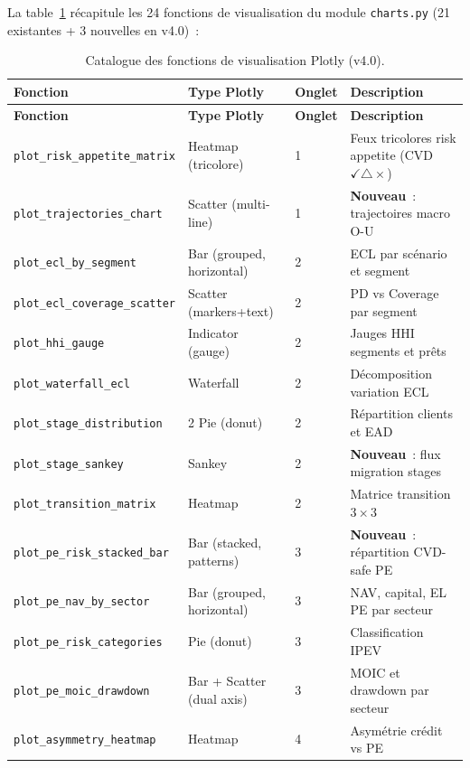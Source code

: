 \documentclass[12pt,a4paper]{article}
\begin{document}
La table~\ref{tab:charts} r\'ecapitule les 24 fonctions de visualisation du module \texttt{charts.py} (21 existantes + 3 nouvelles en v4.0)~:

\begin{longtable}{@{}lp{3.5cm}lp{4cm}@{}}
\caption{Catalogue des fonctions de visualisation Plotly (v4.0).}
\label{tab:charts} \\
\toprule
\textbf{Fonction} & \textbf{Type Plotly} & \textbf{Onglet} & \textbf{Description} \\
\midrule
\endfirsthead
\toprule
\textbf{Fonction} & \textbf{Type Plotly} & \textbf{Onglet} & \textbf{Description} \\
\midrule
\endhead
\texttt{plot\_risk\_appetite\_matrix} & Heatmap (tricolore) & 1 & Feux tricolores risk appetite (CVD~$\checkmark\triangle\times$) \\
\texttt{plot\_trajectories\_chart} & Scatter (multi-line) & 1 & \textbf{Nouveau}~: trajectoires macro O-U \\
\texttt{plot\_ecl\_by\_segment} & Bar (grouped, horizontal) & 2 & ECL par sc\'enario et segment \\
\texttt{plot\_ecl\_coverage\_scatter} & Scatter (markers+text) & 2 & PD vs Coverage par segment \\
\texttt{plot\_hhi\_gauge} & Indicator (gauge) & 2 & Jauges HHI segments et pr\^ets \\
\texttt{plot\_waterfall\_ecl} & Waterfall & 2 & D\'ecomposition variation ECL \\
\texttt{plot\_stage\_distribution} & 2 Pie (donut) & 2 & R\'epartition clients et EAD \\
\texttt{plot\_stage\_sankey} & Sankey & 2 & \textbf{Nouveau}~: flux migration stages \\
\texttt{plot\_transition\_matrix} & Heatmap & 2 & Matrice transition $3\times3$ \\
\texttt{plot\_pe\_risk\_stacked\_bar} & Bar (stacked, patterns) & 3 & \textbf{Nouveau}~: r\'epartition CVD-safe PE \\
\texttt{plot\_pe\_nav\_by\_sector} & Bar (grouped, horizontal) & 3 & NAV, capital, EL PE par secteur \\
\texttt{plot\_pe\_risk\_categories} & Pie (donut) & 3 & Classification IPEV \\
\texttt{plot\_pe\_moic\_drawdown} & Bar + Scatter (dual axis) & 3 & MOIC et drawdown par secteur \\
\texttt{plot\_asymmetry\_heatmap} & Heatmap & 4 & Asym\'etrie cr\'edit vs PE \\

\end{longtable}
\end{document}
